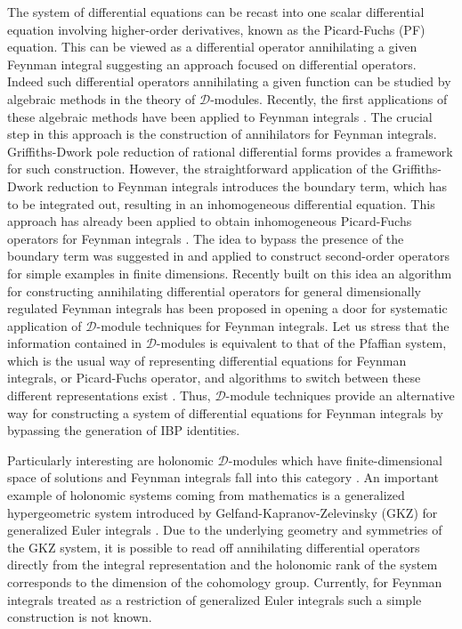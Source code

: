 \documentclass[11pt]{article}
\begin{document}
The system of differential equations can be recast into one scalar differential equation involving higher-order derivatives, known as the Picard-Fuchs (PF) equation. This can be viewed as a differential operator annihilating a given Feynman integral suggesting an approach focused on differential operators. Indeed such differential operators annihilating a given function can be studied by algebraic methods in the theory of $\mathcal{D}$-modules. Recently, the first applications of these algebraic methods have been applied to Feynman integrals \cite{Chestnov:2022alh,Chestnov:2023kww,Henn:2023tbo}. The crucial step in this approach is the construction of annihilators for Feynman integrals. Griffiths-Dwork pole reduction of rational differential forms \cite{Griffiths_1969,Dwork1962,Dwork1964} provides a framework for such construction. 
However, the straightforward application of the Griffiths-Dwork reduction to Feynman integrals introduces the boundary term, which has to be integrated out, resulting in an inhomogeneous differential equation.
This approach has already been applied to obtain inhomogeneous Picard-Fuchs operators for Feynman integrals \cite{Muller-Stach:2012tgj,Lairez:2022zkj,delaCruz:2024xit}.  The idea to bypass the presence of the boundary term was suggested in \cite{Golubeva:1973,Golubeva:1978} and applied to construct second-order operators for simple examples in finite dimensions. Recently built on this idea an algorithm for constructing annihilating differential operators for general dimensionally regulated Feynman integrals has been proposed in \cite{Chestnov:2025whi} opening a door for systematic application of $\mathcal{D}$-module techniques for Feynman integrals. Let us stress that the information contained in $\mathcal{D}$-modules is equivalent to that of the Pfaffian system, which is the usual way of representing differential equations for Feynman integrals, or Picard-Fuchs operator, and algorithms to switch between these different representations exist \cite{saito2000gröbner,Chestnov:2022alh, Chestnov:2025whi,gorlach2025}. Thus, $\mathcal{D}$-module techniques provide an alternative way for constructing a system of differential equations for Feynman integrals by bypassing the generation of IBP identities.  

Particularly interesting are holonomic $\mathcal{D}$-modules which have finite-dimensional space of solutions and Feynman integrals fall into this category \cite{Kashiwara:1977nf}.
An important example of holonomic systems coming from mathematics is a generalized hypergeometric system introduced by Gelfand-Kapranov-Zelevinsky (GKZ) for generalized Euler integrals \cite{Gelfand1989,Gelfand:1990}. Due to the underlying geometry and symmetries of the GKZ system, it is possible to read off annihilating differential operators directly from the integral representation and the holonomic rank of the system corresponds to the dimension of the cohomology group. Currently, for Feynman integrals treated as a restriction of generalized Euler integrals \cite{Chestnov:2022alh,Chestnov:2023kww} such a simple construction is not known.
\end{document}
